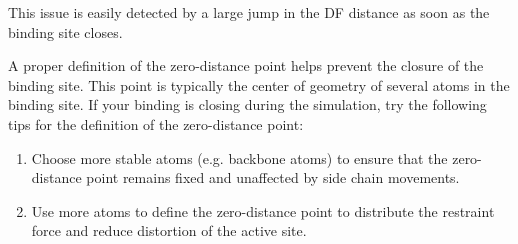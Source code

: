 This issue is easily detected by a large jump in the DF distance as soon as the binding site closes.

A proper definition of the zero-distance point helps prevent the closure of the binding site. This point is typically the center of geometry of several atoms in the binding site. If your binding is closing during the simulation, try the following tips for the definition of the zero-distance point:

\begin{enumerate}
   \item[-] Choose more stable atoms (e.g. backbone atoms) to ensure that the zero-distance point remains fixed and unaffected by side chain movements.
   \item[-] Use more atoms to define the zero-distance point to distribute the restraint force and reduce distortion of the active site.
\end{enumerate}

